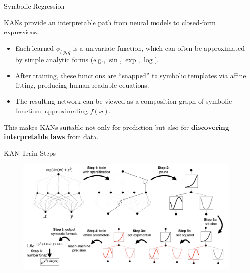 \documentclass[aspectratio=169]{beamer}
\begin{document}

\begin{frame}{Symbolic Regression}
	
	KANs provide an interpretable path from neural models to closed-form expressions:
	
	\begin{itemize}
		\item Each learned $\phi_{l,p,q}$ is a univariate function, which can often be approximated by simple analytic forms (e.g., $\sin$, $\exp$, $\log$).
		\item After training, these functions are ``snapped'' to symbolic templates via affine fitting, producing human-readable equations.
		\item The resulting network can be viewed as a composition graph of symbolic functions approximating $f(x)$.
	\end{itemize}
	
	This makes KANs suitable not only for prediction but also for \textbf{discovering interpretable laws} from data.
	
\end{frame}


\begin{frame}{KAN Train Steps}
	
	\begin{figure}
		\centering
		\includegraphics[height=0.8\textheight]{../images/kan_training.png}
	\end{figure}
	
\end{frame}
\end{document}
